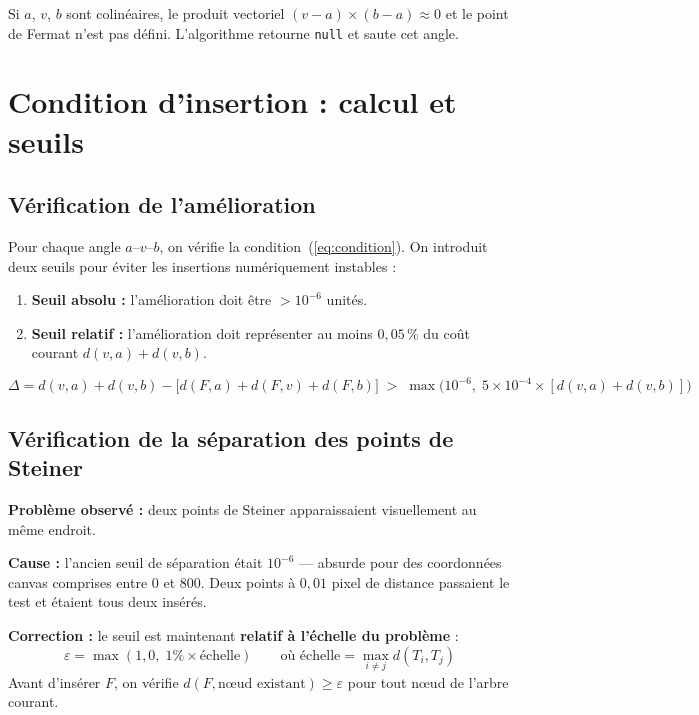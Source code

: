 \documentclass[12pt,a4paper]{article}
\begin{document}
Si $a$, $v$, $b$ sont colinéaires, le produit vectoriel
$(v-a) \times (b-a) \approx 0$ et le point de Fermat n'est pas défini.
L'algorithme retourne \texttt{null} et saute cet angle.

\section{Condition d'insertion : calcul et seuils}

\subsection{Vérification de l'amélioration}

Pour chaque angle $a$--$v$--$b$, on vérifie la condition~(\ref{eq:condition}).
On introduit deux seuils pour éviter les insertions numériquement instables :

\begin{enumerate}
  \item \textbf{Seuil absolu :} l'amélioration doit être $> 10^{-6}$ unités.
  \item \textbf{Seuil relatif :} l'amélioration doit représenter
        au moins $0{,}05\,\%$ du coût courant $d(v,a)+d(v,b)$.
\end{enumerate}

\begin{equation}
  \Delta = d(v,a)+d(v,b) - \bigl[d(F,a)+d(F,v)+d(F,b)\bigr]
  \;>\; \max\!\bigl(10^{-6},\; 5 \times 10^{-4} \times [d(v,a)+d(v,b)]\bigr)
  \label{eq:seuils}
\end{equation}

\subsection{Vérification de la séparation des points de Steiner}

\begin{tcolorbox}[warnbox={Bug corrigé : points de Steiner superposés}]
\textbf{Problème observé :} deux points de Steiner apparaissaient visuellement
au même endroit.

\textbf{Cause :} l'ancien seuil de séparation était $10^{-6}$ --- absurde pour
des coordonnées canvas comprises entre $0$ et $800$.
Deux points à $0{,}01$ pixel de distance passaient le test et étaient tous
deux insérés.

\textbf{Correction :} le seuil est maintenant \textbf{relatif à l'échelle du problème} :
\[
  \varepsilon = \max(1{,}0,\; 1\% \times \text{échelle})
  \qquad \text{où } \text{échelle} = \max_{i \neq j} d(T_i, T_j)
\]
Avant d'insérer $F$, on vérifie $d(F, \text{nœud existant}) \geq \varepsilon$
pour tout nœud de l'arbre courant.
\end{tcolorbox}
\end{document}

